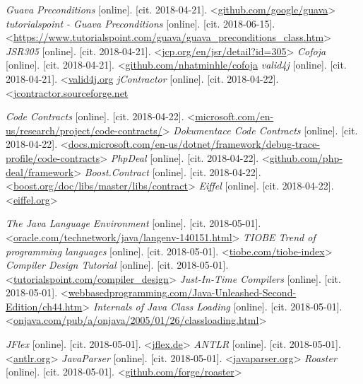 \begin{thebibliography}{99}
 {\it Guava Preconditions} [online]. [cit. 2018-04-21]. \textless\url{github.com/google/guava}\textgreater
{} {\it tutorialspoint - Guava Preconditions} [online]. [cit. 2018-06-15]. \textless\url{https://www.tutorialspoint.com/guava/guava_preconditions_class.htm}\textgreater
{} {\it JSR305} [online]. [cit. 2018-04-21]. \textless\url{jcp.org/en/jsr/detail?id=305}\textgreater
{} {\it Cofoja} [online]. [cit. 2018-04-21]. \textless\url{github.com/nhatminhle/cofoja}
 {\it valid4j} [online]. [cit. 2018-04-21]. \textless\url{valid4j.org}	
 {\it jContractor} [online]. [cit. 2018-04-22]. \textless\url{jcontractor.sourceforge.net}

 {\it Code Contracts} [online]. [cit. 2018-04-22]. \textless\url{microsoft.com/en-us/research/project/code-contracts/}\textgreater
{} {\it Dokumentace Code Contracts} [online]. [cit. 2018-04-22]. \textless\url{docs.microsoft.com/en-us/dotnet/framework/debug-trace-profile/code-contracts}\textgreater
{} {\it PhpDeal} [online]. [cit. 2018-04-22]. \textless\url{github.com/php-deal/framework}\textgreater
{} {\it Boost.Contract} [online]. [cit. 2018-04-22]. \textless\url{boost.org/doc/libs/master/libs/contract}\textgreater
{} {\it Eiffel} [online]. [cit. 2018-04-22]. \textless\url{eiffel.org}\textgreater

 {\it The Java Language Environment} [online]. [cit. 2018-05-01]. \textless\url{oracle.com/technetwork/java/langenv-140151.html}\textgreater
{} {\it TIOBE Trend of programming languages} [online]. [cit. 2018-05-01]. \textless\url{tiobe.com/tiobe-index}\textgreater
{} {\it Compiler Design Tutorial} [online]. [cit. 2018-05-01]. \textless\url{tutorialspoint.com/compiler_design}\textgreater
{} {\it Just-In-Time Compilers} [online]. [cit. 2018-05-01]. \textless\url{webbasedprogramming.com/Java-Unleashed-Second-Edition/ch44.htm}\textgreater
{} {\it Internals of Java Class Loading} [online]. [cit. 2018-05-01]. \textless\url{onjava.com/pub/a/onjava/2005/01/26/classloading.html}\textgreater

 {\it JFlex} [online]. [cit. 2018-05-01]. \textless\url{jflex.de}\textgreater
{} {\it ANTLR} [online]. [cit. 2018-05-01]. \textless\url{antlr.org}\textgreater
{} {\it JavaParser} [online]. [cit. 2018-05-01]. \textless\url{javaparser.org}\textgreater
{} {\it Roaster} [online]. [cit. 2018-05-01]. \textless\url{github.com/forge/roaster}\textgreater





\end{thebibliography}
